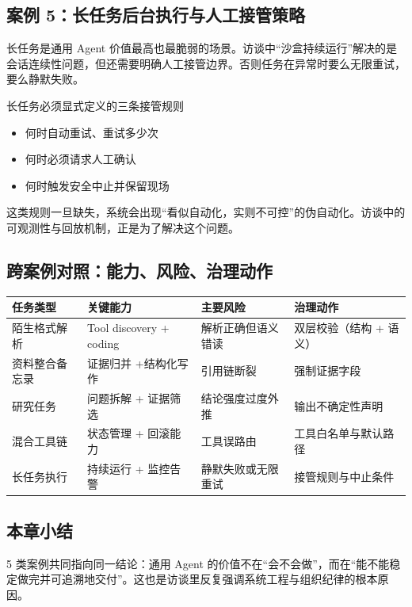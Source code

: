 \subsection{案例 5：长任务后台执行与人工接管策略}

长任务是通用 Agent 价值最高也最脆弱的场景。访谈中“沙盒持续运行”解决的是会话连续性问题，但还需要明确人工接管边界。否则任务在异常时要么无限重试，要么静默失败。

\begin{warningbox}{长任务必须显式定义的三条接管规则}
\begin{itemize}
    \item 何时自动重试、重试多少次
    \item 何时必须请求人工确认
    \item 何时触发安全中止并保留现场
\end{itemize}
\end{warningbox}

这类规则一旦缺失，系统会出现“看似自动化，实则不可控”的伪自动化。访谈中的可观测性与回放机制，正是为了解决这个问题。

\subsection{跨案例对照：能力、风险、治理动作}

\begin{center}
\begin{tabular}{p{3.0cm}p{3.5cm}p{4.1cm}p{3.5cm}}
\toprule
任务类型 & 关键能力 & 主要风险 & 治理动作 \\
\midrule
陌生格式解析 & Tool discovery + coding & 解析正确但语义错读 & 双层校验（结构 + 语义） \\
资料整合备忘录 & 证据归并 +结构化写作 & 引用链断裂 & 强制证据字段 \\
研究任务 & 问题拆解 + 证据筛选 & 结论强度过度外推 & 输出不确定性声明 \\
混合工具链 & 状态管理 + 回滚能力 & 工具误路由 & 工具白名单与默认路径 \\
长任务执行 & 持续运行 + 监控告警 & 静默失败或无限重试 & 接管规则与中止条件 \\
\bottomrule
\end{tabular}
\end{center}

\subsection{本章小结}

5 类案例共同指向同一结论：通用 Agent 的价值不在“会不会做”，而在“能不能稳定做完并可追溯地交付”。这也是访谈里反复强调系统工程与组织纪律的根本原因。


